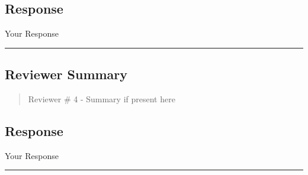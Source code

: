 \subsection{Response}  
Your Response \\
\noindent\rule{17cm}{2.0pt}


\subsection{Reviewer Summary}
\begin{mdframed}
\begin{quote}
	Reviewer \# 4 - Summary if present here
\end{quote}
\end{mdframed}

\subsection{Response} 
Your Response

\noindent\rule{17cm}{6.0pt}
